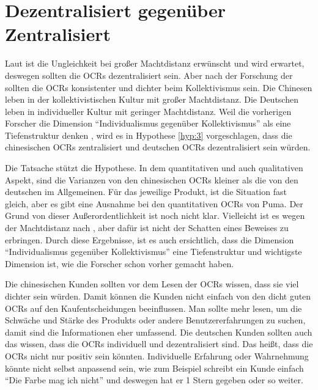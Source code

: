 \section{Dezentralisiert gegenüber Zentralisiert}
Laut \citet{hofstede2013interkulturelle} ist die Ungleichkeit bei großer Machtdistanz erwünscht und wird erwartet, deswegen sollten die \ac{OCRs} dezentralisiert sein. Aber nach der Forschung der \citeauthor{Luo2014} sollten die \ac{OCRs} konsistenter und dichter beim Kollektivismus sein. Die Chinesen leben in der kollektivistischen Kultur mit großer Machtdistanz. Die Deutschen leben in individueller Kultur mit geringer Machtdistanz. Weil die vorherigen Forscher die Dimension ``Individualismus gegenüber Kollektivismus'' als eine Tiefenstruktur denken \citep{grennfield2000approaches,sia2009web, triandis2001individualism}, wird es in Hypothese \ref{hyp:3} vorgeschlagen, dass die chinesischen \ac{OCRs} zentralisiert und deutschen \ac{OCRs} dezentralisiert sein würden.

Die Tatsache stützt die Hypothese. In dem quantitativen und auch qualitativen Aspekt, sind die Varianzen von den chinesischen \ac{OCRs} kleiner als die von den deutschen im Allgemeinen. Für das jeweilige Produkt, ist die Situation fast gleich, aber es gibt eine Ausnahme bei den quantitativen \ac{OCRs} von Puma. Der Grund von dieser Außerordentlichkeit ist noch nicht klar. Vielleicht ist es wegen der Machtdistanz nach \citet{hofstede2013interkulturelle}, aber dafür ist nicht der Schatten eines Beweises zu erbringen. Durch diese Ergebnisse, ist es auch ersichtlich, dass die Dimension ``Individualismus gegenüber Kollektivismus'' eine Tiefenstruktur und wichtigste Dimension ist, wie die Forscher schon vorher gemacht haben. 

Die chinesischen Kunden sollten vor dem Lesen der \ac{OCRs} wissen, dass sie viel dichter sein würden. Damit können die Kunden nicht einfach von den dicht guten \ac{OCRs} auf den Kaufentscheidungen beeinflussen. Man sollte mehr lesen, um die Schwäche und Stärke des Produkts oder andere Benutzererfahrungen zu suchen, damit sind die Informationen eher umfassend. Die deutschen Kunden sollten auch das wissen, dass die \ac{OCRs} individuell und dezentralisiert sind. Das heißt, dass die \ac{OCRs} nicht nur positiv sein könnten. Individuelle Erfahrung oder Wahrnehmung könnte nicht selbst anpassend sein, wie zum Beispiel schreibt ein Kunde einfach ``Die Farbe mag ich nicht'' und deswegen hat er 1 Stern gegeben oder so weiter. 

